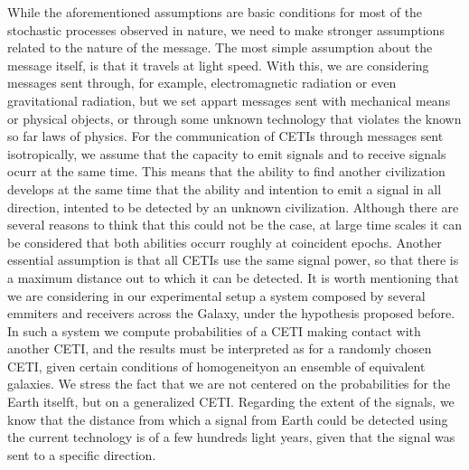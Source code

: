 \documentclass[crop]{CSLB}%
\begin{document}
While the aforementioned assumptions are basic conditions for most of
the stochastic processes observed in nature, 
we need to make stronger assumptions related to the nature of the
message.
%
The most simple assumption about the message itself, is that it
travels at light speed.
%
With this, we are considering messages sent through, for example,
electromagnetic radiation or even gravitational radiation, but we set
appart messages sent with mechanical means or physical objects, or
through some unknown technology that violates the known so far laws of
physics.
% 
For the communication of CETIs through messages sent isotropically, 
we assume that the capacity to emit signals and to receive
signals ocurr at the same time.
%
This means that the ability to find another civilization develops at
the same time that the ability and intention to emit a signal in all
direction, intented to be detected by an unknown civilization.
%
Although there are several reasons to think that this could not be the
case, at large time scales it can be considered that both abilities
occurr roughly at coincident epochs.
%
Another essential assumption is that all CETIs use the same signal power, so that there is a maximum distance out to which it can be detected.
%
It is worth mentioning that we are considering in our experimental
setup a system composed by several emmiters and receivers across the
Galaxy, under the hypothesis proposed before.
%
In such a system we compute probabilities of a CETI making contact
with another CETI, and the results must be interpreted as for a
randomly chosen CETI, given certain conditions of homogeneityon an
ensemble of equivalent galaxies.
%
We stress the fact that we are not centered on the probabilities for
the Earth itselft, but on a generalized CETI.
%
Regarding the extent of the signals, we know that the distance from
which a signal from Earth could be detected using the current
technology is of a few hundreds light years, given that the signal was
sent to a specific direction.


   
\end{document}
